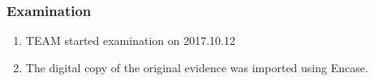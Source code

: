 \subsubsection{Examination}
\begin{enumerate}
\item TEAM started examination on 2017.10.12
\item The digital copy of the original evidence was imported using Encase. 
\end{enumerate}
